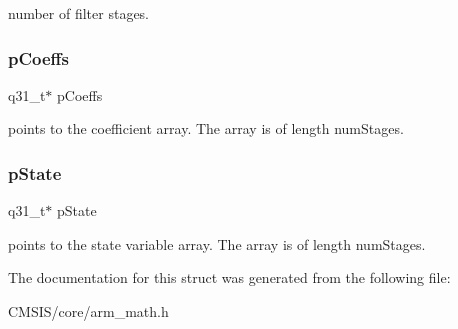 number of filter stages. \mbox{\label{structarm__fir__lattice__instance__q31_a68888e36167d81cb7836db10367a1682}} 
\subsubsection{\texorpdfstring{p\+Coeffs}{pCoeffs}}
{\footnotesize\ttfamily q31\+\_\+t$\ast$ p\+Coeffs}

points to the coefficient array. The array is of length num\+Stages. \mbox{\label{structarm__fir__lattice__instance__q31_adee4ba3ee8869865af7d8fa08ca913d6}} 
\subsubsection{\texorpdfstring{p\+State}{pState}}
{\footnotesize\ttfamily q31\+\_\+t$\ast$ p\+State}

points to the state variable array. The array is of length num\+Stages. 

The documentation for this struct was generated from the following file\+:\begin{DoxyCompactItemize}
\item 
C\+M\+S\+I\+S/core/arm\+\_\+math.\+h\end{DoxyCompactItemize}
